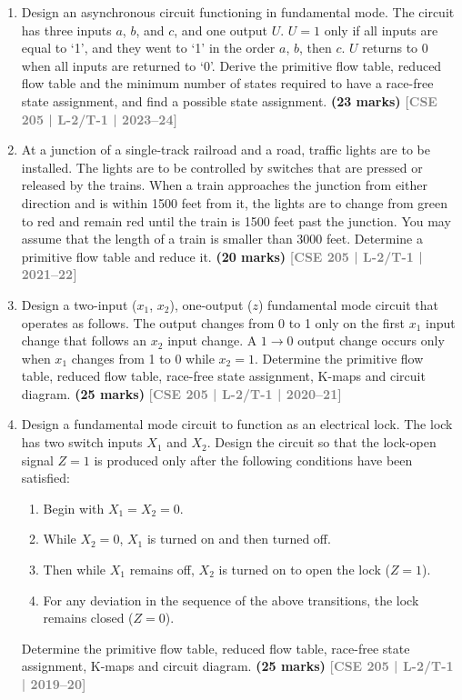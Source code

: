 \documentclass[12pt]{article}
\newcommand{\yr}[1]{\hfill\textcolor{gray}{\small\textbf{[#1]}}}
\newcommand{\mk}[1]{\textcolor{orange!70!black}{\small\textbf{(#1 marks)}}}
\begin{document}
\begin{enumerate}

\item Design an asynchronous circuit functioning in fundamental mode. The circuit has three inputs $a$, $b$, and $c$, and one output $U$. $U=1$ only if all inputs are equal to `1', and they went to `1' in the order $a$, $b$, then $c$. $U$ returns to 0 when all inputs are returned to `0'. Derive the primitive flow table, reduced flow table and the minimum number of states required to have a race-free state assignment, and find a possible state assignment.
\mk{23} \yr{CSE 205 | L-2/T-1 | 2023--24}

\item At a junction of a single-track railroad and a road, traffic lights are to be installed. The lights are to be controlled by switches that are pressed or released by the trains. When a train approaches the junction from either direction and is within 1500 feet from it, the lights are to change from green to red and remain red until the train is 1500 feet past the junction. You may assume that the length of a train is smaller than 3000 feet. Determine a primitive flow table and reduce it.
\mk{20} \yr{CSE 205 | L-2/T-1 | 2021--22}

\item Design a two-input ($x_1$, $x_2$), one-output ($z$) fundamental mode circuit that operates as follows. The output changes from 0 to 1 only on the first $x_1$ input change that follows an $x_2$ input change. A $1\to0$ output change occurs only when $x_1$ changes from 1 to 0 while $x_2=1$. Determine the primitive flow table, reduced flow table, race-free state assignment, K-maps and circuit diagram.
\mk{25} \yr{CSE 205 | L-2/T-1 | 2020--21}

\item Design a fundamental mode circuit to function as an electrical lock. The lock has two switch inputs $X_1$ and $X_2$. Design the circuit so that the lock-open signal $Z=1$ is produced only after the following conditions have been satisfied:
\begin{enumerate}
  \item Begin with $X_1 = X_2 = 0$.
  \item While $X_2 = 0$, $X_1$ is turned on and then turned off.
  \item Then while $X_1$ remains off, $X_2$ is turned on to open the lock ($Z=1$).
  \item For any deviation in the sequence of the above transitions, the lock remains closed ($Z=0$).
\end{enumerate}
Determine the primitive flow table, reduced flow table, race-free state assignment, K-maps and circuit diagram.
\mk{25} \yr{CSE 205 | L-2/T-1 | 2019--20}


\end{enumerate}
\end{document}
